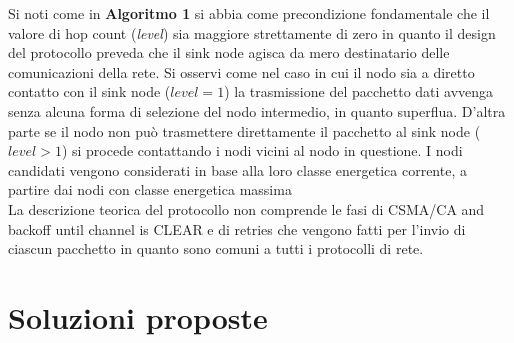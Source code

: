 \documentclass[binding=0.6cm,TFA]{sapthesis}
\begin{document}
Si noti come in \textbf{Algoritmo 1} si abbia come precondizione fondamentale che il valore di hop count (\emph{level}) sia maggiore strettamente
di zero in quanto il design del protocollo preveda che il sink node agisca da mero destinatario delle comunicazioni della rete. Si osservi come
nel caso in cui il nodo sia a diretto contatto con il sink node ($level=1$) la trasmissione del pacchetto dati avvenga senza alcuna forma di
selezione del nodo intermedio, in quanto superflua. D'altra parte se il nodo non può trasmettere direttamente il pacchetto al sink node ($level>1$)
si procede contattando i nodi vicini al nodo in questione. I nodi candidati vengono considerati in base alla loro classe energetica corrente,
a partire dai nodi con classe energetica massima \\

La descrizione teorica del protocollo non comprende le fasi di CSMA/CA and backoff until channel is CLEAR e di retries che vengono fatti
per l'invio di ciascun pacchetto in quanto sono comuni a tutti i protocolli di rete.

\chapter{Soluzioni proposte}
\end{document}
